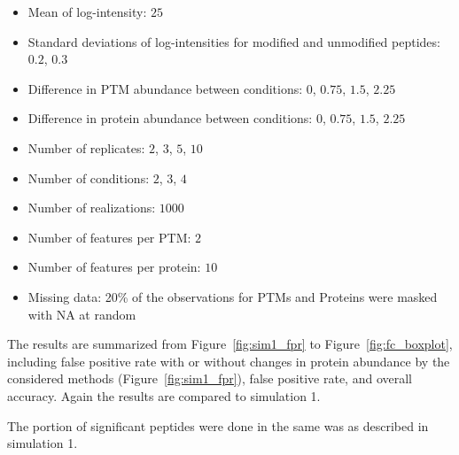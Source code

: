 \documentclass{mcp}
\def\sfigref#1{{Figure~\ref{#1}}}
\begin{document}
\begin{itemize}
\item Mean of log-intensity: $25$
\item Standard deviations of log-intensities for modified and unmodified peptides: $0.2$, $0.3$
\item Difference in PTM abundance between conditions: $0$, $0.75$, $1.5$, $2.25$
\item Difference in protein abundance between conditions: $0$, $0.75$, $1.5$, $2.25$
\item Number of replicates: $2$, $3$, $5$, $10$
\item Number of conditions: $2$, $3$, $4$
\item Number of realizations: $1000$
\item Number of features per PTM: $2$
\item Number of features per protein: $10$
\item Missing data: 20\% of the observations for PTMs and Proteins were masked with NA at random
\end{itemize}

The results are summarized from \sfigref{fig:sim1_fpr} to \sfigref{fig:fc_boxplot}, including false positive rate with or without changes in protein abundance by the considered methods (\sfigref{fig:sim1_fpr}), false positive rate, and overall accuracy. Again the results are compared to simulation 1.

The portion of significant peptides were done in the same was as described in simulation 1.
\end{document}

